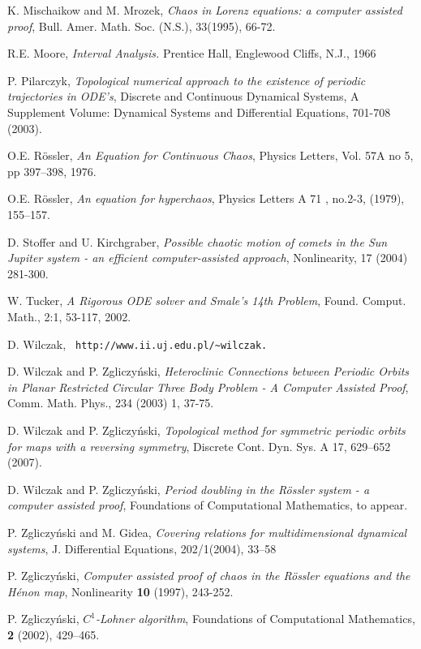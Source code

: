 \documentclass[10pt,a4paper]{article}
\begin{document}
\begin{thebibliography}{GSS}
 K. Mischaikow and M. Mrozek,
\emph{Chaos in Lorenz equations: a computer assisted proof},
Bull. Amer. Math. Soc. (N.S.), 33(1995), 66-72.

 R.E. Moore, \emph{Interval Analysis.} Prentice
Hall, Englewood Cliffs, N.J., 1966


 P. Pilarczyk, \emph{Topological numerical approach to the existence of periodic trajectories in ODE's},
Discrete and Continuous Dynamical Systems, A Supplement Volume:
Dynamical Systems and Differential Equations, 701-708 (2003).


 O.E. R\"ossler, \emph{An Equation for Continuous Chaos}, Physics Letters, Vol. 57A no 5, pp 397--398, 1976.

 O.E. R\"ossler, \emph{An equation for hyperchaos}, Physics Letters A 71 , no.2-3, (1979), 155--157.

 D. Stoffer and U. Kirchgraber, \emph{Possible chaotic motion of comets in the Sun Jupiter system -
an efficient computer-assisted approach}, Nonlinearity, 17 (2004)
281-300.

 W. Tucker, \emph{A Rigorous ODE solver and Smale's 14th Problem},
Found. Comput. Math., 2:1, 53-117, 2002.

 D. Wilczak, {\tt
http://www.ii.uj.edu.pl/\~{}wilczak.}

 D. Wilczak and P. Zgliczy\'nski, \emph{Heteroclinic Connections between Periodic Orbits in
Planar Restricted Circular Three Body Problem - A Computer Assisted
Proof}, Comm. Math. Phys.,  234 (2003) 1, 37-75.

 D. Wilczak and P. Zgliczy\'nski, \emph{Topological method
for symmetric periodic orbits for maps with a reversing symmetry},
 Discrete Cont. Dyn. Sys. A 17, 629--652 (2007).

 D. Wilczak and P. Zgliczy\'nski, \emph{Period doubling in the R\"ossler system - a computer assisted proof},
 Foundations of Computational Mathematics, to appear.

 P. Zgliczy\'nski and  M. Gidea, \emph{Covering relations for multidimensional
     dynamical systems},  J.  Differential Equations, 202/1(2004), 33--58

 P. Zgliczy\'nski, \emph{Computer assisted proof of
chaos in the R\"ossler equations and the H\'enon map},  Nonlinearity {\bf 10}
(1997), 243-252.

 P. Zgliczy\'nski,  \emph{$C^1$-Lohner algorithm}, Foundations
of Computational Mathematics, {\bf 2} (2002), 429--465.

\end{thebibliography}
\end{document}
